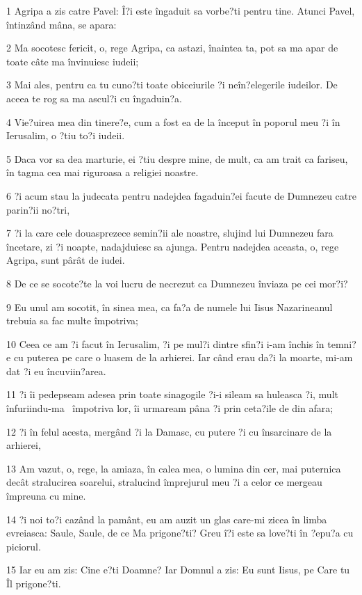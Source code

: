 \par 1 Agripa a zis catre Pavel: Î?i este îngaduit sa vorbe?ti pentru tine. Atunci Pavel, întinzând mâna, se apara:
\par 2 Ma socotesc fericit, o, rege Agripa, ca astazi, înaintea ta, pot sa ma apar de toate câte ma învinuiesc iudeii;
\par 3 Mai ales, pentru ca tu cuno?ti toate obiceiurile ?i neîn?elegerile iudeilor. De aceea te rog sa ma ascul?i cu îngaduin?a.
\par 4 Vie?uirea mea din tinere?e, cum a fost ea de la început în poporul meu ?i în Ierusalim, o ?tiu to?i iudeii.
\par 5 Daca vor sa dea marturie, ei ?tiu despre mine, de mult, ca am trait ca fariseu, în tagma cea mai riguroasa a religiei noastre.
\par 6 ?i acum stau la judecata pentru nadejdea fagaduin?ei facute de Dumnezeu catre parin?ii no?tri,
\par 7 ?i la care cele douasprezece semin?ii ale noastre, slujind lui Dumnezeu fara încetare, zi ?i noapte, nadajduiesc sa ajunga. Pentru nadejdea aceasta, o, rege Agripa, sunt pârât de iudei.
\par 8 De ce se socote?te la voi lucru de necrezut ca Dumnezeu înviaza pe cei mor?i?
\par 9 Eu unul am socotit, în sinea mea, ca fa?a de numele lui Iisus Nazarineanul trebuia sa fac multe împotriva;
\par 10 Ceea ce am ?i facut în Ierusalim, ?i pe mul?i dintre sfin?i i-am închis în temni?e cu puterea pe care o luasem de la arhierei. Iar când erau da?i la moarte, mi-am dat ?i eu încuviin?area.
\par 11 ?i îi pedepseam adesea prin toate sinagogile ?i-i sileam sa huleasca ?i, mult înfuriindu-ma  împotriva lor, îi urmaream pâna ?i prin ceta?ile de din afara;
\par 12 ?i în felul acesta, mergând ?i la Damasc, cu putere ?i cu însarcinare de la arhierei,
\par 13 Am vazut, o, rege, la amiaza, în calea mea, o lumina din cer, mai puternica decât stralucirea soarelui, stralucind împrejurul meu ?i a celor ce mergeau împreuna cu mine.
\par 14 ?i noi to?i cazând la pamânt, eu am auzit un glas care-mi zicea în limba evreiasca: Saule, Saule, de ce Ma prigone?ti? Greu î?i este sa love?ti în ?epu?a cu piciorul.
\par 15 Iar eu am zis: Cine e?ti Doamne? Iar Domnul a zis: Eu sunt Iisus, pe Care tu Îl prigone?ti.
